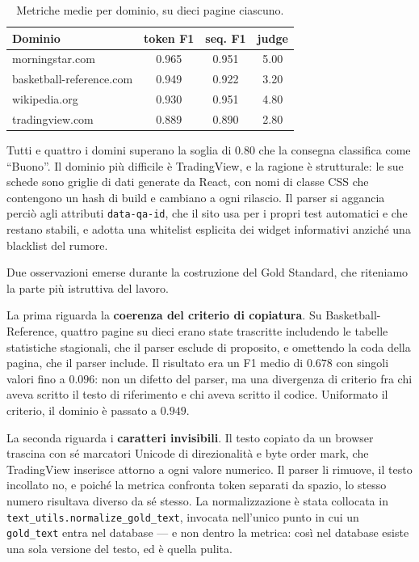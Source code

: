 \documentclass[10pt,a4paper,twocolumn]{article}
\begin{document}
\begin{table}[htbp]
\centering
\footnotesize
\setlength{\tabcolsep}{4pt}
\begin{tabular}{lccc}
\toprule
\textbf{Dominio} & \textbf{token F1} & \textbf{seq. F1} & \textbf{judge} \\
\midrule
morningstar.com          & 0.965 & 0.951 & 5.00 \\
basketball-reference.com & 0.949 & 0.922 & 3.20 \\
wikipedia.org            & 0.930 & 0.951 & 4.80 \\
tradingview.com          & 0.889 & 0.890 & 2.80 \\
\bottomrule
\end{tabular}
\caption{Metriche medie per dominio, su dieci pagine ciascuno.}
\label{tab:parser}
\end{table}

Tutti e quattro i domini superano la soglia di $0.80$ che la consegna
classifica come ``Buono''. Il dominio più difficile è TradingView, e la ragione
è strutturale: le sue schede sono griglie di dati generate da React, con nomi
di classe CSS che contengono un hash di build e cambiano a ogni rilascio. Il
parser si aggancia perciò agli attributi \texttt{data-qa-id}, che il sito usa
per i propri test automatici e che restano stabili, e adotta una whitelist
esplicita dei widget informativi anziché una blacklist del rumore.

Due osservazioni emerse durante la costruzione del Gold Standard, che
riteniamo la parte più istruttiva del lavoro.

La prima riguarda la \textbf{coerenza del criterio di copiatura}. Su
Basketball-Reference, quattro pagine su dieci erano state trascritte includendo
le tabelle statistiche stagionali, che il parser esclude di proposito, e
omettendo la coda della pagina, che il parser include. Il risultato era un F1
medio di $0.678$ con singoli valori fino a $0.096$: non un difetto del parser,
ma una divergenza di criterio fra chi aveva scritto il testo di riferimento e
chi aveva scritto il codice. Uniformato il criterio, il dominio è passato a
$0.949$.

La seconda riguarda i \textbf{caratteri invisibili}. Il testo copiato da un
browser trascina con sé marcatori Unicode di direzionalità e byte order mark,
che TradingView inserisce attorno a ogni valore numerico. Il parser li rimuove,
il testo incollato no, e poiché la metrica confronta token separati da spazio,
lo stesso numero risultava diverso da sé stesso. La normalizzazione è stata
collocata in \texttt{text\_utils.normalize\_gold\_text}, invocata nell'unico
punto in cui un \texttt{gold\_text} entra nel database --- e non dentro la
metrica: così nel database esiste una sola versione del testo, ed è quella
pulita.
\end{document}
